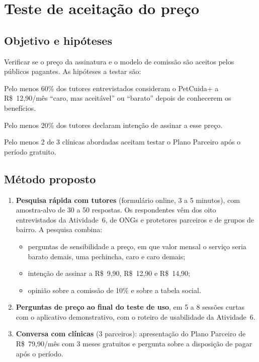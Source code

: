 \section{Teste de aceitação do preço}
\label{sec:teste}

\subsection{Objetivo e hipóteses}

Verificar se o preço da assinatura e o modelo de comissão são aceitos pelos públicos
pagantes. As hipóteses a testar são:

\begin{description}[font=\bfseries, leftmargin=1.4em, style=unboxed]
  \item[H1.] Pelo menos 60\% dos tutores entrevistados consideram o PetCuida+ a R\$~12,90/mês
  ``caro, mas aceitável'' ou ``barato'' depois de conhecerem os benefícios.
  \item[H2.] Pelo menos 20\% dos tutores declaram intenção de assinar a esse preço.
  \item[H3.] Pelo menos 2 de 3 clínicas abordadas aceitam testar o Plano Parceiro após o período gratuito.
\end{description}

\subsection{Método proposto}

\begin{enumerate}
  \item \textbf{Pesquisa rápida com tutores} (formulário online, 3 a 5 minutos), com amostra-alvo
  de 30 a 50 respostas. Os respondentes vêm dos oito entrevistados da Atividade~6, de ONGs
  e protetores parceiros e de grupos de bairro. A pesquisa combina:
  \begin{itemize}
    \item perguntas de sensibilidade a preço, em que valor mensal o serviço seria
    barato demais, uma pechincha, caro e caro demais;
    \item intenção de assinar a R\$~9,90, R\$~12,90 e R\$~14,90;
    \item opinião sobre a comissão de 10\% e sobre a tabela social.
  \end{itemize}
  \item \textbf{Perguntas de preço ao final do teste de uso}, em 5 a 8 sessões curtas com o
  aplicativo demonstrativo, com o roteiro de usabilidade da Atividade~6.
  \item \textbf{Conversa com clínicas} (3 parceiros): apresentação do Plano Parceiro de R\$~79,90/mês
  com 3 meses gratuitos e pergunta sobre a disposição de pagar após o período.
\end{enumerate}

